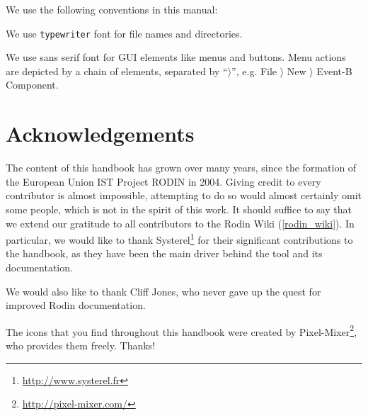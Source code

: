 \documentclass{book}
\begin{document}
We use the following conventions in this manual:


We use \texttt{typewriter} font for file names and directories.

We use \textsf{sans serif font} for GUI elements like menus and buttons.  Menu actions are depicted by a chain of elements, separated by ``$\rangle$'', e.g. \textsf{File $\rangle$ New $\rangle$ Event-B Component}.

\section{Acknowledgements}
\label{sec:acknowledgements}

The content of this handbook has grown over many years, since the formation of the European Union IST Project RODIN in 2004.  Giving credit to every contributor is almost impossible, attempting to do so would almost certainly omit some people, which is not in the spirit of this work.  It should suffice to say that we extend our gratitude to all contributors to the Rodin Wiki (\ref{rodin_wiki}). In particular, we would like to thank Systerel\footnote{\url{http://www.systerel.fr}} for their significant contributions to the handbook, as they have been the main driver behind the tool and its documentation.

We would also like to thank Cliff Jones, who never gave up the quest for improved Rodin documentation.

The icons that you find throughout this handbook were created by Pixel-Mixer\footnote{\url{http://pixel-mixer.com/}}, who provides them freely.  Thanks!











\clearpage
{} 
\printindex
\end{document}
